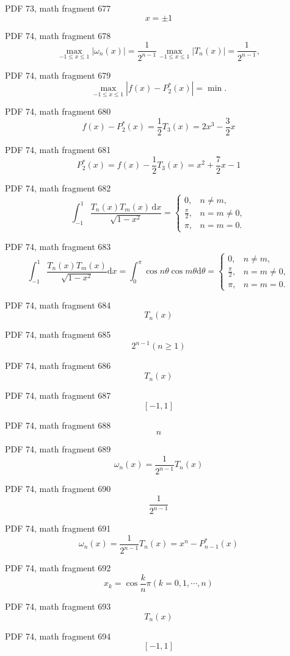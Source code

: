 \documentclass[UTF8,fontset=fandol]{ctexart}
\begin{document}
PDF 73, math fragment 677
\[x=\pm1\]
\par
PDF 74, math fragment 678
\[
\max_{-1 \leqslant x \leqslant 1} |\omega_n(x)| = \frac{1}{2^{n-1}} \max_{-1 \leqslant x \leqslant 1} |T_n(x)| = \frac{1}{2^{n-1}} ,
\]
\par
PDF 74, math fragment 679
\[
\max_{-1 \leqslant x \leqslant 1} |f(x) - P_{2}^*(x)| = \min .
\]
\par
PDF 74, math fragment 680
\[
f(x) - P_{2}^*(x) = \frac{1}{2} T_3(x) = 2x^3 - \frac{3}{2}x
\]
\par
PDF 74, math fragment 681
\[
P_{2}^*(x) = f(x) - \frac{1}{2} T_3(x) = x^2 + \frac{7}{2}x - 1
\]
\par
PDF 74, math fragment 682
\[
\int_{-1}^{1} \frac{T_n(x)T_m(x)\,\mathrm{d}x}{\sqrt{1-x^2}} = \begin{cases} 0, & n \neq m, \\ \frac{\pi}{2}, & n = m \neq 0, \\ \pi, & n = m = 0. \end{cases} \tag{3.4.8}
\]
\par
PDF 74, math fragment 683
\[
\int_{-1}^{1} \frac{T_n(x)T_m(x)}{\sqrt{1-x^2}} \mathrm{d}x = \int_{0}^{\pi} \cos n\theta \cos m\theta \mathrm{d}\theta = \begin{cases} 0, & n \neq m, \\ \frac{\pi}{2}, & n = m \neq 0, \\ \pi, & n = m = 0. \end{cases}
\]
\par
PDF 74, math fragment 684
\[T_n(x)\]
\par
PDF 74, math fragment 685
\[2^{n-1}(n \geqslant 1)\]
\par
PDF 74, math fragment 686
\[T_n(x)\]
\par
PDF 74, math fragment 687
\[[-1,1]\]
\par
PDF 74, math fragment 688
\[n\]
\par
PDF 74, math fragment 689
\[\omega_n(x) = \frac{1}{2^{n-1}} T_n(x)\]
\par
PDF 74, math fragment 690
\[\frac{1}{2^{n-1}}\]
\par
PDF 74, math fragment 691
\[\omega_n(x) = \frac{1}{2^{n-1}} T_n(x) = x^n - P_{n-1}^*(x)\]
\par
PDF 74, math fragment 692
\[x_k = \cos \frac{k}{n}\pi (k=0,1,\cdots,n)\]
\par
PDF 74, math fragment 693
\[T_n(x)\]
\par
PDF 74, math fragment 694
\[[-1,1]\]
\par
\end{document}
